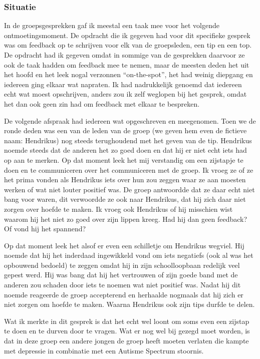 \subsubsection{Situatie}
In de groepsgesprekken gaf ik meestal een taak mee voor het volgende ontmoetingsmoment. De opdracht die ik gegeven had voor dit specifieke gesprek was om feedback op te schrijven voor elk van de groepsleden, een tip en een top. De opdracht had ik gegeven omdat in sommige van de gesprekken daarvoor ze ook de taak hadden om feedback mee te nemen, maar de meesten deden het uit het hoofd en het leek nogal verzonnen ``on-the-spot'', het had weinig diepgang en iedereen ging elkaar wat napraten. Ik had nadrukkelijk genoemd dat iedereen echt wat moest opschrijven, anders zou ik zelf weglopen bij het gesprek, omdat het dan ook geen zin had om feedback met elkaar te bespreken.

De volgende afspraak had iedereen wat opgeschreven en meegenomen. Toen we de ronde deden was een van de leden van de groep (we geven hem even de fictieve naam: Hendrikus) nog steeds terughoudend met het geven van de tip. Hendrikus noemde steeds dat de anderen het zo goed doen en dat hij er niet echt iets had op aan te merken. Op dat moment leek het mij verstandig om een zijstapje te doen en te communiceren over het communiceren met de groep. Ik vroeg ze of ze het prima vonden als Hendrikus iets over hun zou zeggen waar ze aan moesten werken of wat niet louter positief was. De groep antwoordde dat ze daar echt niet bang voor waren, dit verwoordde ze ook naar Hendrikus, dat hij zich daar niet zorgen over hoefde te maken. Ik vroeg ook Hendrikus of hij misschien wist waarom hij het niet zo goed over zijn lippen kreeg. Had hij dan geen feedback? Of vond hij het spannend? 

Op dat moment leek het alsof er even een schilletje om Hendrikus wegviel. Hij noemde dat hij het inderdaad ingewikkeld vond om iets negatiefs (ook al was het opbouwend bedoeld) te zeggen omdat hij in zijn schoolloopbaan redelijk veel gepest werd. Hij was bang dat hij het vertrouwen of zijn goede band met de anderen zou schaden door iets te noemen wat niet positief was. Nadat hij dit noemde reageerde de groep accepterend en herhaalde nogmaals dat hij zich er niet zorgen om hoefde te maken. Waarna Hendrikus ook zijn tips durfde te delen.

Wat ik merkte in dit gesprek is dat het echt wel loont om soms even een zijstap te doen en te durven door te vragen. Wat er nog wel bij gezegd moet worden, is dat in deze groep een andere jongen de groep heeft moeten verlaten die kampte met depressie in combinatie met een Autisme Spectrum stoornis.

